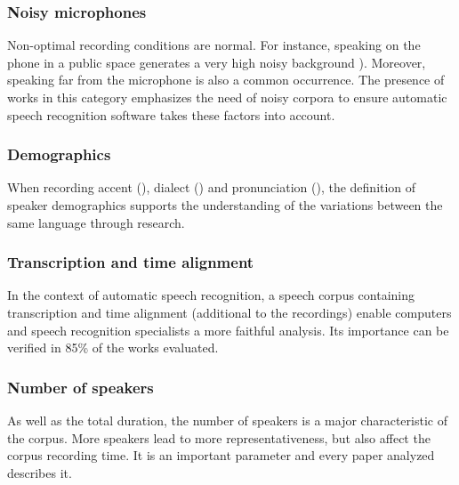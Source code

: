 \subsubsection{Noisy microphones}

Non-optimal recording conditions are normal. For instance, speaking on the phone in a public space generates a very high noisy background \cite{moore2017sheffield}). Moreover, speaking far from the microphone is also a common occurrence. The presence of works in this category emphasizes the need of noisy corpora to ensure automatic speech recognition software takes these factors into account.

\subsubsection{Demographics}

When recording accent (\cite{moore2017sheffield}), dialect (\cite{almeman2018building}) and pronunciation (\cite{ng2017shefce}), the definition of speaker demographics supports the understanding of the variations between the same language through research.

\subsubsection{Transcription and time alignment}

In the context of automatic speech recognition, a speech corpus containing  transcription and time alignment (additional to the recordings) enable computers and speech recognition specialists a more faithful analysis. Its importance can be verified in 85\% of the works evaluated.



\subsubsection{Number of speakers}

As well as the total duration, the number of speakers is a major characteristic of the corpus. More speakers lead to more representativeness, but also affect the corpus recording time. It is an important parameter and every paper analyzed describes it.
